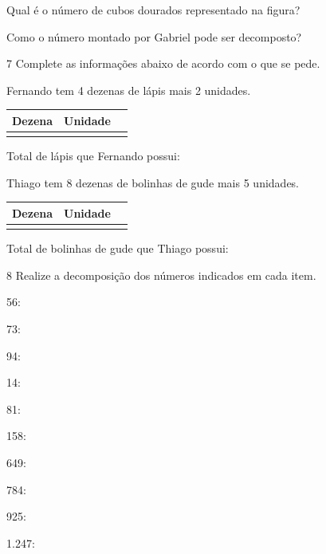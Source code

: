 \begin{escolha}
\item Qual é o número de cubos dourados representado na figura?

\item Como o número montado por Gabriel pode ser decomposto?
\end{escolha}

\num{7} Complete as informações abaixo de acordo com o que se pede. 

\begin{escolha}
\item
  Fernando tem 4 dezenas de lápis mais 2 unidades.

\begin{longtable}[]{@{}lll@{}}
\toprule
\textbf{Dezena} & \textbf{Unidade}\tabularnewline
\midrule
\endhead
&\tabularnewline
\bottomrule
\end{longtable}


Total de lápis que Fernando possui:

\item Thiago tem 8 dezenas de bolinhas de gude mais 5 unidades.

\begin{longtable}[]{@{}lll@{}}
\toprule
\textbf{Dezena} & \textbf{Unidade}\tabularnewline
\midrule
\endhead
&\tabularnewline
\bottomrule
\end{longtable}

Total de bolinhas de gude que Thiago possui:
\end{escolha}

\num{8} Realize a decomposição dos números indicados em cada item.

\begin{escolha}
\item 56: 

\item 73: 

\item 94: 

\item 14: 

\item 81: 

\item 158: 

\item 649: 

\item 784: 

\item 925: 

\item 1.247: 
\end{escolha}


